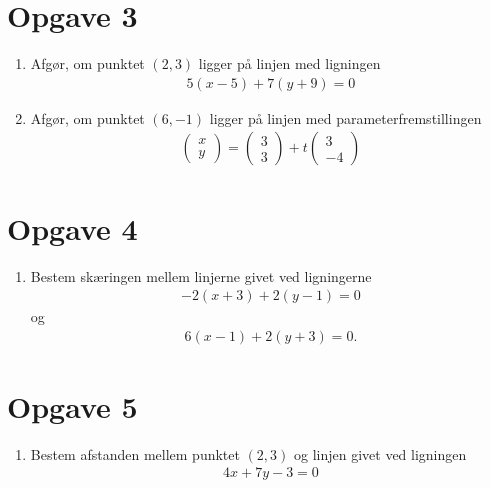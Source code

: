 \section*{Opgave 3}
\begin{enumerate}[label=\roman*)	]
	\item Afgør, om punktet $(2,3)$ ligger på linjen med ligningen 
	\begin{align*}
		5(x-5) + 7(y+9)=0
	\end{align*}
	\item Afgør, om punktet $(6,-1)$ ligger på linjen med parameterfremstillingen
	\begin{align*}
		\begin{pmatrix}
			x \\ y
		\end{pmatrix}
		=
		\begin{pmatrix}
			3 \\ 3
		\end{pmatrix}
		+ t
		\begin{pmatrix}
			3 \\ -4
		\end{pmatrix}
	\end{align*}
\end{enumerate}

\section*{Opgave 4}
\begin{enumerate}[label=\roman*)]
	\item Bestem skæringen mellem linjerne givet ved ligningerne
	\begin{align*}
		-2(x+3)+2(y-1) = 0
	\end{align*}
	og 
	\begin{align*}
		6(x-1) +2(y+3) = 0.
	\end{align*}
\end{enumerate}

\section*{Opgave 5}
\begin{enumerate}[label=\roman*)]
	\item Bestem afstanden mellem punktet $(2,3)$ og linjen givet ved ligningen
	\begin{align*}
		4x+7y-3=0
	\end{align*}
\end{enumerate}
